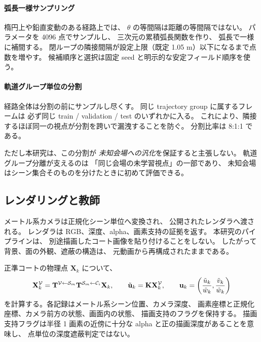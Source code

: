 \paragraph{弧長一様サンプリング}
楕円上や鉛直変動のある経路上では、
\(\theta\) の等間隔は距離の等間隔ではない。
パラメータを 4096 点でサンプルし、
三次元の累積弧長関数を作り、
弧長で一様に補間する。
閉ループの隣接間隔が設定上限（既定 1.05 m）以下になるまで点数を増やす。
候補順序と選択は固定 seed と明示的な安定フィールド順序を使う。

\paragraph{軌道グループ単位の分割}
経路全体は分割の前にサンプルし尽くす。
同じ trajectory group に属するフレームは
必ず同じ train / validation / test のいずれかに入る。
これにより、隣接するほぼ同一の視点が分割を跨いで漏洩することを防ぐ。
分割比率は 8:1:1 である。

ただし本研究は、この分割が
\emph{未知会場への汎化}を保証すると主張しない。
軌道グループ分離が支えるのは
「同じ会場の未学習視点」の一部であり、
未知会場はシーン集合そのものを分けたときに初めて評価できる。



\subsection{レンダリングと教師}
\label{sec:labels}

メートル系カメラは正規化シーン単位へ変換され、
公開されたレンダラへ渡される。
レンダラは RGB、深度、alpha、画素支持の証拠を返す。
本研究のパイプラインは、
別途描画したコート画像を貼り付けることをしない。
したがって背景、面の外観、遮蔽の構造は、
元動画から再構成されたままである。

正準コートの物理点 \(\mathbf{X}_k\) について、
\begin{equation}
  \mathbf{X}^{\mathcal{V}}_k =
  \mathbf{T}^{\mathcal{V}\leftarrow \mathcal{S}_m}\mathbf{T}^{\mathcal{S}_m\leftarrow \mathcal{C}_i}\mathbf{X}_k,
  \qquad
  \tilde{\mathbf{u}}_k=\mathbf{K}\mathbf{X}^{\mathcal{V}}_k,
  \qquad
  \mathbf{u}_k=\left(\frac{\tilde u_k}{\tilde w_k},
                       \frac{\tilde v_k}{\tilde w_k}\right)
  \label{eq:label_projection}
\end{equation}
を計算する。各記録はメートル系シーン位置、カメラ深度、
画素座標と正規化座標、カメラ前方の状態、画面内の状態、
描画支持のフラグを保持する。
描画支持フラグは半径 1 画素の近傍に十分な alpha と正の描画深度があることを意味し、
点単位の深度遮蔽判定ではない。


